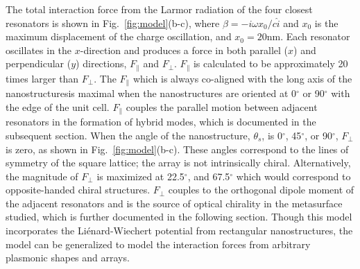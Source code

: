 The total interaction force from the Larmor radiation of the four closest resonators is shown in Fig.~\ref{fig:model}(b-c), where $\beta = -i\omega x_0/c\hat{i}$ and $x_0$ is the maximum displacement of the charge oscillation, and $x_0 = 20$nm. Each resonator oscillates in the $x$-direction and produces a force in both parallel ($x$) and perpendicular ($y$) directions, $F_{\parallel}$ and  $F_{\perp}$. $F_{\parallel}$ is calculated to be approximately 20 times larger than $F_{\perp}$.
The $F_{\parallel}$ \textemdash which is always co-aligned with the long axis of the nanostructures\textemdash is maximal when the nanostructures are oriented at 0$^\circ$ or 90$^\circ$ with the edge of the unit cell. $F_{\parallel}$ couples the parallel motion between adjacent resonators in the formation of hybrid modes, which is documented in the subsequent section. When the angle of the nanostructure, $\theta_s$, is 0$^\circ$, 45$^\circ$, or 90$^\circ$, $F_\perp$ is zero, as shown in Fig.~\ref{fig:model}(b-c). These angles correspond to the lines of symmetry of the square lattice; the array is not intrinsically chiral. Alternatively, the magnitude of $F_{\perp}$ is maximized at 22.5$^\circ$, and 67.5$^\circ$ which would correspond to opposite-handed chiral structures. $F_\perp$ couples to the orthogonal dipole moment of the adjacent resonators and is the source of optical chirality in the metasurface studied, which is further documented in the following section. Though this model incorporates the Li\'{e}nard-Wiechert potential from rectangular nanostructures, the model can be generalized to model the interaction forces from arbitrary plasmonic shapes and arrays.

